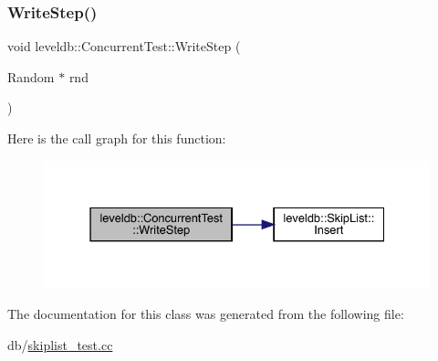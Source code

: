 \subsubsection{\texorpdfstring{WriteStep()}{WriteStep()}}
{\footnotesize\ttfamily void leveldb\+::\+Concurrent\+Test\+::\+Write\+Step (\begin{DoxyParamCaption}\item[{Random $\ast$}]{rnd }\end{DoxyParamCaption})\hspace{0.3cm}{\ttfamily [inline]}}

Here is the call graph for this function\+:
\nopagebreak
\begin{figure}[H]
\begin{center}
\leavevmode
\includegraphics[width=331pt]{classleveldb_1_1_concurrent_test_a43dc8afb9124c364d6e97dc3d421131f_cgraph}
\end{center}
\end{figure}


The documentation for this class was generated from the following file\+:\begin{DoxyCompactItemize}
\item 
db/\mbox{\hyperlink{skiplist__test_8cc}{skiplist\+\_\+test.\+cc}}\end{DoxyCompactItemize}

